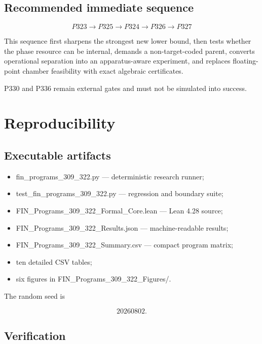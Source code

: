 \documentclass[11pt,a4paper,openany]{report}
\begin{document}
\section{Recommended immediate sequence}

\[
\boxed{
P323
\to
P325
\to
P324
\to
P326
\to
P327
}
\]

This sequence first sharpens the strongest new lower bound, then tests whether the phase resource can be internal, demands a non-target-coded parent, converts operational separation into an apparatus-aware experiment, and replaces floating-point chamber feasibility with exact algebraic certificates.

P330 and P336 remain external gates and must not be simulated into success.

\chapter{Reproducibility}

\section{Executable artifacts}

\begin{itemize}
\item 
fin\_programs\_309\_322.py --- deterministic research runner;

\item 
test\_fin\_programs\_309\_322.py --- regression and boundary suite;

\item 
FIN\_Programs\_309\_322\_Formal\_Core.lean --- Lean 4.28 source;

\item 
FIN\_Programs\_309\_322\_Results.json --- machine-readable results;

\item 
FIN\_Programs\_309\_322\_Summary.csv --- compact program matrix;

\item 
ten detailed CSV tables;

\item 
six figures in FIN\_Programs\_309\_322\_Figures/\allowbreak{}.

\end{itemize}

The random seed is

\[
20260802.
\]

\section{Verification}
\end{document}
